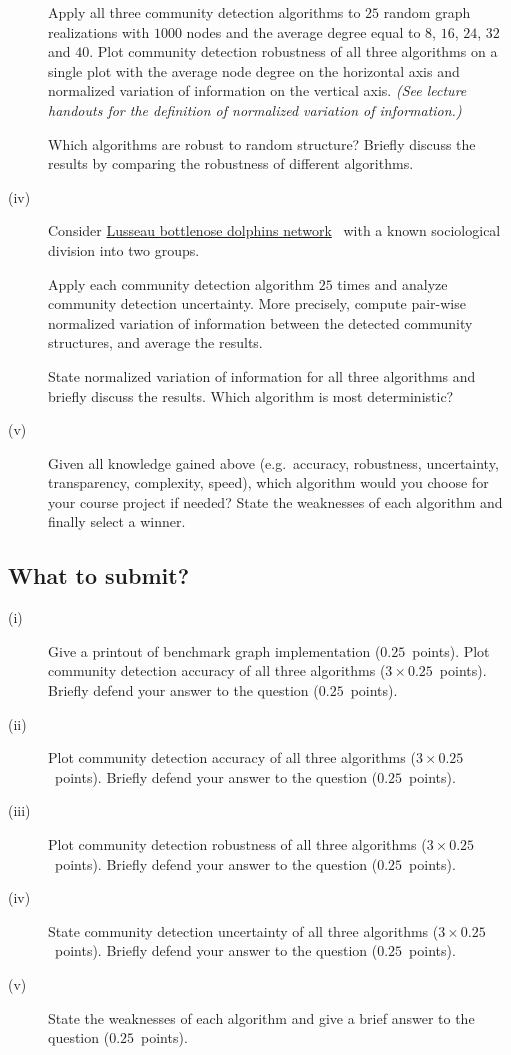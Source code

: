 \documentclass[11pt,a4paper]{article}
\newcommand{\hint}[1]{{\it (#1)}}
\newcommand{\points}[1]{({\color{magenta}$#1$~points})}
\begin{document}
\begin{description}
	Apply all three community detection algorithms to $25$ random graph realizations with $1000$ nodes and the average degree equal to $8$, $16$, $24$, $32$ and $40$. Plot community detection robustness of all three algorithms on a single plot with the average node degree on the horizontal axis and normalized variation of information on the vertical axis. \hint{See lecture handouts for the definition of normalized variation of information.} 
	
	Which algorithms are robust to random structure? Briefly discuss the results by comparing the robustness of different algorithms.

	\item[(iv)] Consider \href{http://lovro.lpt.fri.uni-lj.si/ina/nets/dolphins}{Lusseau bottlenose dolphins network}~\cite{LSBHSD03} with a known sociological division into two groups. 
	
	Apply each community detection algorithm $25$ times and analyze community detection uncertainty. More precisely, compute pair-wise normalized variation of information between the detected community structures, and average the results. 
	
	State normalized variation of information for all three algorithms and briefly discuss the results. Which algorithm is most deterministic?

	\item[(v)] Given all knowledge gained above (e.g.\ accuracy, robustness, uncertainty, transparency, complexity, speed), which algorithm would you choose for your course project if needed? State the weaknesses of each algorithm and finally select a winner.

\end{description}

\subsection*{What to submit?}

\begin{description}
	\item[(i)] Give a printout of benchmark graph implementation \points{0.25}. Plot community detection accuracy of all three algorithms \points{3\times 0.25}. Briefly defend your answer to the question \points{0.25}.
	\item[(ii)] Plot community detection accuracy of all three algorithms \points{3\times 0.25}. Briefly defend your answer to the question \points{0.25}.
	\item[(iii)] Plot community detection robustness of all three algorithms \points{3\times 0.25}. Briefly defend your answer to the question \points{0.25}.
	\item[(iv)] State community detection uncertainty of all three algorithms \points{3\times 0.25}. Briefly defend your answer to the question \points{0.25}.
	\item[(v)] State the weaknesses of each algorithm and give a brief answer to the question \points{0.25}.
\end{description}
\end{document}
